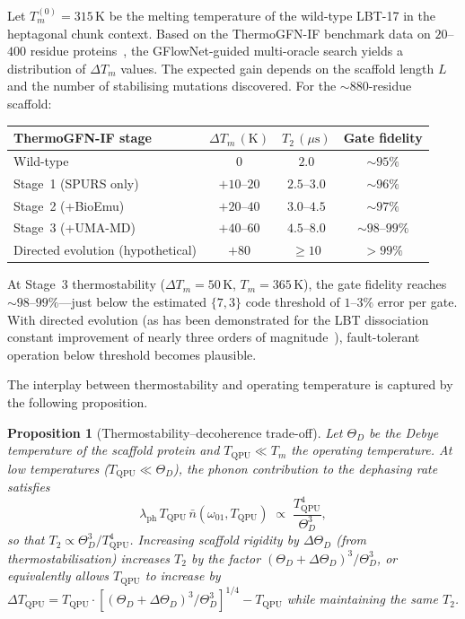 \documentclass[11pt,oneside]{amsbook}
\numberwithin{equation}{section}
\theoremstyle{plain}
\newtheorem{proposition}[theorem]{Proposition}
\theoremstyle{definition}
\theoremstyle{remark}
\begin{document}
Let $T_m^{(0)} = 315\,\text{K}$ be the melting temperature of the wild-type
LBT-17 in the heptagonal chunk context.  Based on the ThermoGFN-IF benchmark
data on $20$--$400$ residue proteins~\cite{SchreiberThermoGFN2025}, the
GFlowNet-guided multi-oracle search yields a distribution of
$\Delta T_m$ values.  The expected gain depends on the scaffold length $L$
and the number of stabilising mutations discovered.  For the $\sim 880$-residue
scaffold:
\begin{center}
\renewcommand{\arraystretch}{1.4}
\begin{tabular}{lccc}
\toprule
\textbf{ThermoGFN-IF stage} & $\Delta T_m\,(\text{K})$ & $T_2\,(\mu\text{s})$
  & Gate fidelity \\
\midrule
Wild-type & $0$ & $2.0$ & $\sim 95\%$ \\
Stage~1 (SPURS only) & $+10$--$20$ & $2.5$--$3.0$ & $\sim 96\%$ \\
Stage~2 (+BioEmu) & $+20$--$40$ & $3.0$--$4.5$ & $\sim 97\%$ \\
Stage~3 (+UMA-MD) & $+40$--$60$ & $4.5$--$8.0$ & $\sim 98$--$99\%$ \\
Directed evolution (hypothetical) & $+80$ & $\ge 10$ & $> 99\%$ \\
\bottomrule
\end{tabular}
\end{center}
At Stage~3 thermostability ($\Delta T_m = 50\,\text{K}$, $T_m = 365\,\text{K}$),
the gate fidelity reaches $\sim 98$--$99\%$---just below the estimated
$\{7,3\}$ code threshold of $1$--$3\%$ error per gate.  With directed
evolution (as has been demonstrated for the LBT dissociation constant
improvement of nearly three orders of magnitude~\cite{RosalenyEtAl2017}),
fault-tolerant operation below threshold becomes plausible.

The interplay between thermostability and operating temperature is captured
by the following proposition.

\begin{proposition}[Thermostability--decoherence trade-off]
\label{prop:thermo_decoherence}
Let $\Theta_D$ be the Debye temperature of the scaffold protein and
$T_{\mathrm{QPU}} \ll T_m$ the operating temperature.  At low temperatures
($T_{\mathrm{QPU}} \ll \Theta_D$), the phonon contribution to the dephasing
rate satisfies
\[
  \lambda_{\mathrm{ph}}\,T_{\mathrm{QPU}}\,\bar{n}(\omega_{01},T_{\mathrm{QPU}})
  \;\propto\; \frac{T_{\mathrm{QPU}}^4}{\Theta_D^3},
\]
so that $T_2 \propto \Theta_D^3 / T_{\mathrm{QPU}}^4$.
Increasing scaffold rigidity by $\Delta\Theta_D$ (from thermostabilisation)
increases $T_2$ by the factor $(\Theta_D + \Delta\Theta_D)^3/\Theta_D^3$,
or equivalently allows $T_{\mathrm{QPU}}$ to increase by
$\Delta T_{\mathrm{QPU}} = T_{\mathrm{QPU}}\cdot[(\Theta_D+\Delta\Theta_D)^3/\Theta_D^3]^{1/4}
- T_{\mathrm{QPU}}$ while maintaining the same $T_2$.
\end{proposition}
\end{document}
